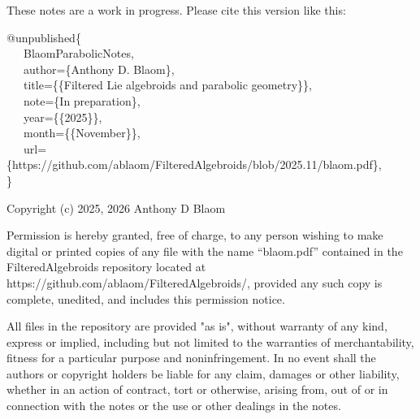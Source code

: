 \documentclass[leqno,12pt]{amsart} %
\begin{document}
\noindent%
These notes are a work in progress. Please cite this version like this:
\vspace{\baselineskip}

{\ttfamily
\noindent%
@unpublished\{\\
\mbox{~~~}BlaomParabolicNotes,\\
\mbox{~~~}author=\{Anthony D. Blaom\},\\
\mbox{~~~}title=\{\{Filtered Lie algebroids and parabolic geometry\}\},\\
\mbox{~~~}note=\{In preparation\},\\
\mbox{~~~}year=\{\{2025\}\},\\
\mbox{~~~}month=\{\{November\}\},\\
\mbox{~~~}url=\{https://github.com/ablaom/FilteredAlgebroids/blob/2025.11/blaom.pdf\},\\
\}
}

\vfill
{\footnotesize
\noindent%
Copyright (c) 2025, 2026 Anthony D Blaom
\vspace{\baselineskip}

\noindent%
Permission is hereby granted, free of charge, to any person wishing to make digital or
printed copies of any file with the name ``blaom.pdf'' contained in the FilteredAlgebroids
repository located at https://github.com/ablaom/FilteredAlgebroids/, provided any such
copy is complete, unedited, and includes this permission notice.  \vspace{\baselineskip}

\noindent%
All files in the repository are provided "as is", without warranty of any kind, express or
implied, including but not limited to the warranties of merchantability, fitness for a
particular purpose and noninfringement. In no event shall the authors or copyright holders
be liable for any claim, damages or other liability, whether in an action of contract,
tort or otherwise, arising from, out of or in connection with the notes or the use or
other dealings in the notes.  \vspace{\baselineskip}
}

\newpage
\end{document}
